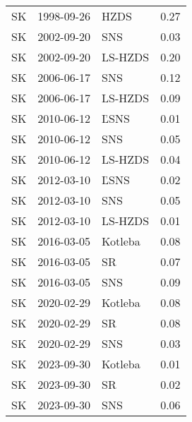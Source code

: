 \begin{longtable}{lllr}
  SK & 1998-09-26 & HZDS & 0.27 \\ 
  SK & 2002-09-20 & SNS & 0.03 \\ 
  SK & 2002-09-20 & LS-HZDS & 0.20 \\ 
  SK & 2006-06-17 & SNS & 0.12 \\ 
  SK & 2006-06-17 & LS-HZDS & 0.09 \\ 
  SK & 2010-06-12 & ĽSNS & 0.01 \\ 
  SK & 2010-06-12 & SNS & 0.05 \\ 
  SK & 2010-06-12 & LS-HZDS & 0.04 \\ 
  SK & 2012-03-10 & ĽSNS & 0.02 \\ 
  SK & 2012-03-10 & SNS & 0.05 \\ 
  SK & 2012-03-10 & LS-HZDS & 0.01 \\ 
  SK & 2016-03-05 & Kotleba & 0.08 \\ 
  SK & 2016-03-05 & SR & 0.07 \\ 
  SK & 2016-03-05 & SNS & 0.09 \\ 
  SK & 2020-02-29 & Kotleba & 0.08 \\ 
  SK & 2020-02-29 & SR & 0.08 \\ 
  SK & 2020-02-29 & SNS & 0.03 \\ 
  SK & 2023-09-30 & Kotleba & 0.01 \\ 
  SK & 2023-09-30 & SR & 0.02 \\ 
  SK & 2023-09-30 & SNS & 0.06 \\ 
   \hline
\hline
\end{longtable}
